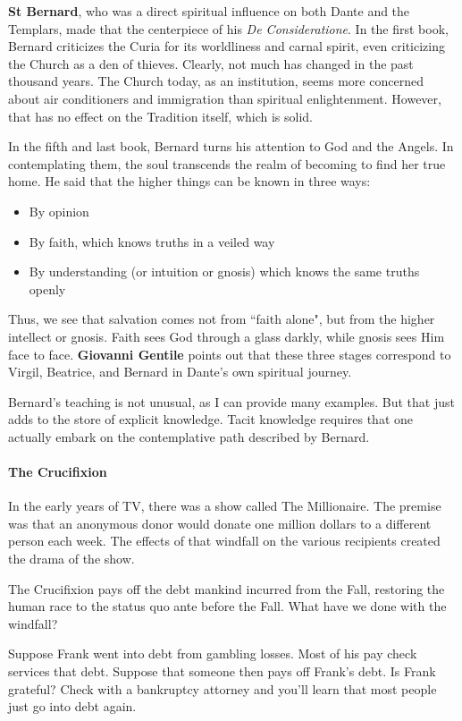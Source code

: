 \textbf{St Bernard}, who was a direct spiritual influence on both Dante and the Templars, made that the centerpiece of his \emph{De Consideratione}. In the first book, Bernard criticizes the Curia for its worldliness and carnal spirit, even criticizing the Church as a den of thieves. Clearly, not much has changed in the past thousand years. The Church today, as an institution, seems more concerned about air conditioners and immigration than spiritual enlightenment. However, that has no effect on the Tradition itself, which is solid.

In the fifth and last book, Bernard turns his attention to God and the Angels. In contemplating them, the soul transcends the realm of becoming to find her true home. He said that the higher things can be known in three ways:

\begin{itemize}
\item By opinion 
\item By faith, which knows truths in a veiled way 
\item By understanding (or intuition or gnosis) which knows the same truths openly 
\end{itemize}
Thus, we see that salvation comes not from ``faith alone", but from the higher intellect or gnosis. Faith sees God through a glass darkly, while gnosis sees Him face to face. \textbf{Giovanni Gentile} points out that these three stages correspond to Virgil, Beatrice, and Bernard in Dante's own spiritual journey.

Bernard's teaching is not unusual, as I can provide many examples. But that just adds to the store of explicit knowledge. Tacit knowledge requires that one actually embark on the contemplative path described by Bernard.

\paragraph{The Crucifixion}
In the early years of TV, there was a show called The Millionaire. The premise was that an anonymous donor would donate one million dollars to a different person each week. The effects of that windfall on the various recipients created the drama of the show.

The Crucifixion pays off the debt mankind incurred from the Fall, restoring the human race to the status quo ante before the Fall. What have we done with the windfall?

Suppose Frank went into debt from gambling losses. Most of his pay check services that debt. Suppose that someone then pays off Frank's debt. Is Frank grateful? Check with a bankruptcy attorney and you'll learn that most people just go into debt again.

